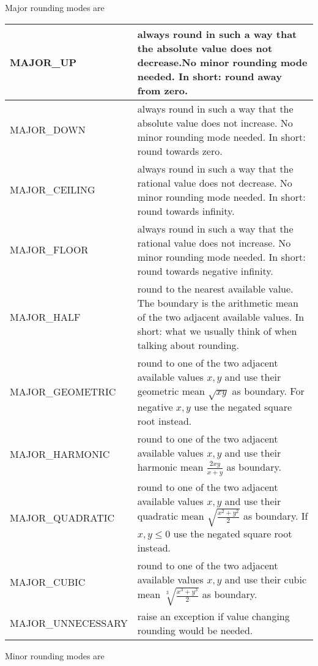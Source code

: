 \documentclass[10pt,a4paper]{article}
\begin{document}
Major rounding modes are

\begin{tabular}{|l|p{100mm}|}
\hline
  MAJOR\_UP           & always round in such a way that the absolute value does not decrease.No minor rounding mode needed.  In short: round away from zero.\\
\hline
  MAJOR\_DOWN         & always round in such a way that the absolute value does not increase. No minor rounding mode needed.  In short: round towards zero.\\
\hline
  MAJOR\_CEILING      & always round in such a way that the rational value does not decrease. No minor rounding mode needed.  In short: round towards infinity.\\
\hline
  MAJOR\_FLOOR        & always round in such a way that the rational value does not increase. No minor rounding mode needed.  In short: round towards negative infinity.\\
\hline
  MAJOR\_HALF         & round to the nearest available value.  The boundary is the arithmetic mean of the two adjacent available values. In short: what we usually think of when talking about rounding.\\
\hline
  MAJOR\_GEOMETRIC    & round to one of the two adjacent available values $x,y$ and use their geometric mean $\sqrt{xy}$ as boundary.  For negative $x,y$ use the negated square root instead.\\
\hline
  MAJOR\_HARMONIC     & round to one of the two adjacent available values $x,y$ and use their harmonic mean $\frac{2xy}{x+y}$ as boundary.\\
\hline
  MAJOR\_QUADRATIC    & round to one of the two adjacent available values $x,y$ and use their quadratic mean $\sqrt{\frac{x^2+y^2}{2}}$ as boundary.  If $x,y\le 0$ use the negated square root instead.\\
\hline
  MAJOR\_CUBIC        & round to one of the two adjacent available values $x,y$ and use their cubic mean $\sqrt[3]{\frac{x^3+y^3}{2}}$ as boundary.\\
\hline
  MAJOR\_UNNECESSARY  & raise an exception if value changing rounding would be needed.\\
\hline
\end{tabular}

\pagebreak

Minor rounding modes are
\end{document}
